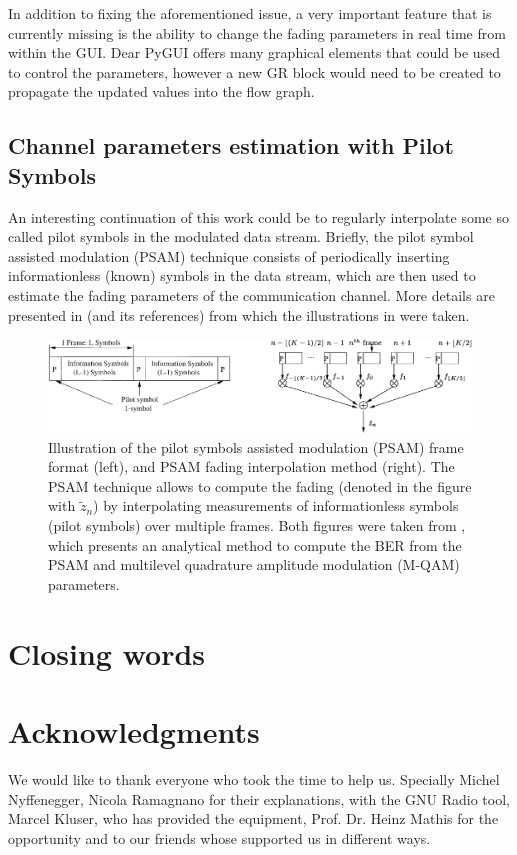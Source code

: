 In addition to fixing the aforementioned issue, a very important feature that is currently missing is the ability to change the fading parameters in real time from within the GUI. Dear PyGUI offers many graphical elements that could be used to control the parameters, however a new GR block would need to be created to propagate the updated values into the flow graph.

\subsection{Channel parameters estimation with Pilot Symbols}

An interesting continuation of this work could be to regularly interpolate some so called pilot symbols in the modulated data stream. Briefly, the pilot symbol assisted modulation (PSAM) technique consists of periodically inserting informationless (known) symbols in the data stream, which are then used to estimate the fading parameters of the communication channel. More details are presented in \cite{Xiaoyi1999} (and its references) from which the illustrations in  were taken.

\begin{figure}
	\centering
	\includegraphics[width = \linewidth]{figures/xiaoyi-psam-figures}
	\caption{
		Illustration of the pilot symbols assisted modulation (PSAM) frame format (left), and PSAM fading interpolation method (right). The PSAM technique allows to compute the fading (denoted in the figure with \(\tilde{z}_n\)) by interpolating measurements of informationless symbols (pilot symbols) over multiple frames. Both figures were taken from \cite{Xiaoyi1999}, which presents an analytical method to compute the BER from the PSAM and multilevel quadrature amplitude modulation (M-QAM) parameters.
		\label{fig:psam}
	}
\end{figure}

\section{Closing words}

\section{Acknowledgments}


We would like to thank everyone who took the time to help us. Specially Michel Nyffenegger, Nicola Ramagnano for their explanations, with the GNU Radio tool,
Marcel Kluser, who has provided the equipment, Prof. Dr. Heinz Mathis for the opportunity and to our friends whose supported us in different ways.



